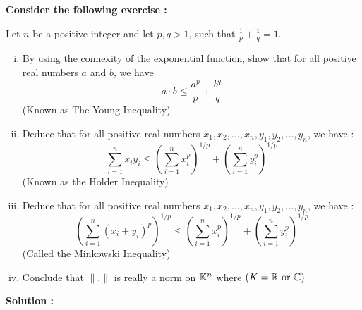 \begin{center}
	\textbf{
Consider the following exercise : 
	}
\end{center}
Let $n$ be a positive integer and let $p,q > 1$, such that 
$\frac{1}{p} + \frac{1}{q} = 1$. 
\begin{enumerate}[(i)]
	\item By using the connexity of the exponential function,
		show that for all positive real numbers $a$ and $b$, we have
		\[
		a \cdot  b \leq 
		\frac{a ^{p}}{p} + 
		\frac{b^{q}}{q}
		\]
		(Known as The Young Inequality)
	\item Deduce that for all positive real numbers 
		$x_1,x_2, ..., x_{n}, y_1, y_2, \hdots , y_{n}$, we have :
		\[
		\sum_{i=1}^{n} x_{i} y_{i} 
		\leq 
		\left( 
			\sum_{i=1}^{n} x_{i}^{p}
		\right)^{1/p}  
		+
		\left( 
			\sum_{i=1}^{n} 
			y_{i}^{p}
		\right)^{1/p}
		\] 
		(Known as the Holder Inequality) 
\item 
	Deduce that for all positive
	real numbers $x_1,x_2, ...
	, x_{n}, y_1,y_2, ..., y_{n}$, we have : 
	\[
		\left( 
	\sum_{i=1}^{n} 
	\left( x_{i}+y_{i} \right)^{p}
		\right)^{1/p} \leq 
		\left( 
			\sum_{i=1}^{n} 
			x_{i}^{p}
		\right)^{1/p} + 
		\left( 
			\sum_{i=1}^{n} 
			y_{i}^{p}
		\right)^{1/p}
	\]
	(Called the Minkowski Inequality)
\item Conclude that $\| . \| $  is really
	a norm on $\mathbb{K}^{n}$  where 
	$\left( K = \mathbb{R} \text{ or } \mathbb{C} \right)$ 
\end{enumerate}
\begin{center}
	\textbf{Solution : }
\end{center}
